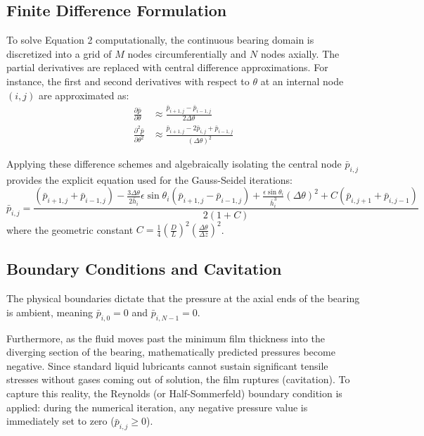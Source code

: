 \documentclass[12pt, a4paper]{article}
\begin{document}
\subsection{Finite Difference Formulation}
To solve Equation 2 computationally, the continuous bearing domain is discretized into a grid of $M$ nodes circumferentially and $N$ nodes axially. The partial derivatives are replaced with central difference approximations. For instance, the first and second derivatives with respect to $\theta$ at an internal node $(i,j)$ are approximated as:
\begin{align}
\frac{\partial\bar{p}}{\partial\theta} &\approx \frac{\bar{p}_{i+1,j} - \bar{p}_{i-1,j}}{2\Delta\theta} \\
\frac{\partial^2\bar{p}}{\partial\theta^2} &\approx \frac{\bar{p}_{i+1,j} - 2\bar{p}_{i,j} + \bar{p}_{i-1,j}}{(\Delta\theta)^2}
\end{align}

Applying these difference schemes and algebraically isolating the central node $\bar{p}_{i,j}$ provides the explicit equation used for the Gauss-Seidel iterations:
\begin{equation}
\bar{p}_{i,j} = \frac{(\bar{p}_{i+1,j} + \bar{p}_{i-1,j}) - \frac{3\Delta\theta}{2\bar{h}_i}\epsilon\sin\theta_i(\bar{p}_{i+1,j} - \bar{p}_{i-1,j}) + \frac{\epsilon\sin\theta_i}{\bar{h}_i^3}(\Delta\theta)^2 + C(\bar{p}_{i,j+1} + \bar{p}_{i,j-1})}{2(1 + C)}
\end{equation}
where the geometric constant $C = \frac{1}{4}\left(\frac{D}{L}\right)^2\left(\frac{\Delta\theta}{\Delta\bar{z}}\right)^2$.

\subsection{Boundary Conditions and Cavitation}
The physical boundaries dictate that the pressure at the axial ends of the bearing is ambient, meaning $\bar{p}_{i, 0} = 0$ and $\bar{p}_{i, N-1} = 0$. 

Furthermore, as the fluid moves past the minimum film thickness into the diverging section of the bearing, mathematically predicted pressures become negative. Since standard liquid lubricants cannot sustain significant tensile stresses without gases coming out of solution, the film ruptures (cavitation). To capture this reality, the Reynolds (or Half-Sommerfeld) boundary condition is applied: during the numerical iteration, any negative pressure value is immediately set to zero ($\bar{p}_{i,j} \geq 0$).
\end{document}
